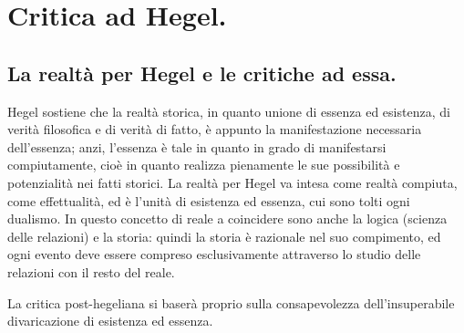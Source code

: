 \chapter{Critica ad Hegel.}
\bigskip
\section{La realtà per Hegel e le critiche ad essa.}

Hegel sostiene che la realtà storica, in quanto unione di essenza ed esistenza, di verità filosofica e di verità di fatto, è appunto la manifestazione necessaria dell'essenza; anzi, l'essenza è tale in quanto in grado di manifestarsi compiutamente, cioè in quanto realizza pienamente le sue possibilità e potenzialità nei fatti storici. La realtà per Hegel va intesa come realtà compiuta, come effettualità, ed è l'unità di esistenza ed essenza, cui sono tolti ogni dualismo. In questo concetto di reale a coincidere sono anche la logica (scienza delle relazioni) e la storia: quindi la storia è razionale nel suo compimento, ed ogni evento deve essere compreso esclusivamente attraverso lo studio delle relazioni con il resto del reale.

La critica post-hegeliana si baserà proprio sulla consapevolezza dell'insuperabile divaricazione di esistenza ed essenza.